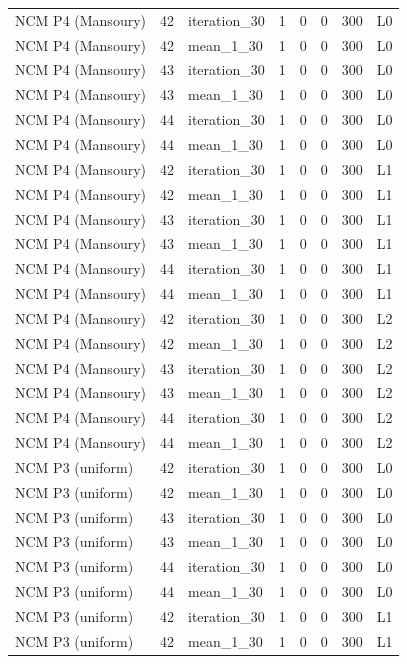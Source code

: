 \begin{table}[htbp!]
\begin{tabular}{lrlrrrrl}
NCM P4 (Mansoury) & 42 & iteration\_30 & 1 & 0 & 0 & 300 & L0 \\
NCM P4 (Mansoury) & 42 & mean\_1\_30 & 1 & 0 & 0 & 300 & L0 \\
NCM P4 (Mansoury) & 43 & iteration\_30 & 1 & 0 & 0 & 300 & L0 \\
NCM P4 (Mansoury) & 43 & mean\_1\_30 & 1 & 0 & 0 & 300 & L0 \\
NCM P4 (Mansoury) & 44 & iteration\_30 & 1 & 0 & 0 & 300 & L0 \\
NCM P4 (Mansoury) & 44 & mean\_1\_30 & 1 & 0 & 0 & 300 & L0 \\
NCM P4 (Mansoury) & 42 & iteration\_30 & 1 & 0 & 0 & 300 & L1 \\
NCM P4 (Mansoury) & 42 & mean\_1\_30 & 1 & 0 & 0 & 300 & L1 \\
NCM P4 (Mansoury) & 43 & iteration\_30 & 1 & 0 & 0 & 300 & L1 \\
NCM P4 (Mansoury) & 43 & mean\_1\_30 & 1 & 0 & 0 & 300 & L1 \\
NCM P4 (Mansoury) & 44 & iteration\_30 & 1 & 0 & 0 & 300 & L1 \\
NCM P4 (Mansoury) & 44 & mean\_1\_30 & 1 & 0 & 0 & 300 & L1 \\
NCM P4 (Mansoury) & 42 & iteration\_30 & 1 & 0 & 0 & 300 & L2 \\
NCM P4 (Mansoury) & 42 & mean\_1\_30 & 1 & 0 & 0 & 300 & L2 \\
NCM P4 (Mansoury) & 43 & iteration\_30 & 1 & 0 & 0 & 300 & L2 \\
NCM P4 (Mansoury) & 43 & mean\_1\_30 & 1 & 0 & 0 & 300 & L2 \\
NCM P4 (Mansoury) & 44 & iteration\_30 & 1 & 0 & 0 & 300 & L2 \\
NCM P4 (Mansoury) & 44 & mean\_1\_30 & 1 & 0 & 0 & 300 & L2 \\
NCM P3 (uniform) & 42 & iteration\_30 & 1 & 0 & 0 & 300 & L0 \\
NCM P3 (uniform) & 42 & mean\_1\_30 & 1 & 0 & 0 & 300 & L0 \\
NCM P3 (uniform) & 43 & iteration\_30 & 1 & 0 & 0 & 300 & L0 \\
NCM P3 (uniform) & 43 & mean\_1\_30 & 1 & 0 & 0 & 300 & L0 \\
NCM P3 (uniform) & 44 & iteration\_30 & 1 & 0 & 0 & 300 & L0 \\
NCM P3 (uniform) & 44 & mean\_1\_30 & 1 & 0 & 0 & 300 & L0 \\
NCM P3 (uniform) & 42 & iteration\_30 & 1 & 0 & 0 & 300 & L1 \\
NCM P3 (uniform) & 42 & mean\_1\_30 & 1 & 0 & 0 & 300 & L1 \\

\end{tabular}
\end{table}
